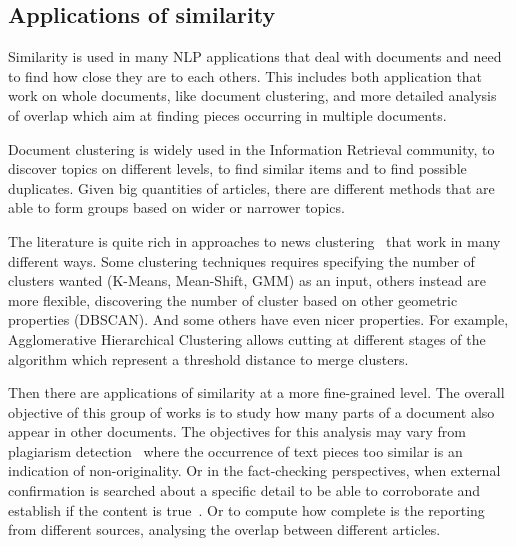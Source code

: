 \subsection{Applications of similarity}

Similarity is used in many NLP applications that deal with documents and need to find how close they are to each others. This includes both application that work on whole documents, like document clustering, and more detailed analysis of overlap which aim at finding pieces occurring in multiple documents.

Document clustering is widely used in the Information Retrieval community, to discover topics on different levels, to find similar items and to find possible duplicates. Given big quantities of articles, there are different methods that are able to form groups based on wider or narrower topics.

The literature is quite rich in approaches to news clustering~\cite{carpineto2009survey,andrews2007recent} %
that work in many different ways.
Some clustering techniques requires specifying the number of clusters wanted (K-Means, Mean-Shift, GMM) as an input, others instead are more flexible, discovering the number of cluster based on other geometric properties (DBSCAN).
And some others have even nicer properties.
For example, Agglomerative Hierarchical Clustering allows cutting at different stages of the algorithm which represent a threshold distance to merge clusters.






Then there are applications of similarity at a more fine-grained level.
The overall objective of this group of works is to study how many parts of a document also appear in other documents.
The objectives for this analysis may vary from plagiarism detection~\cite{potthast2010evaluation} where the occurrence of text pieces too similar is an indication of non-originality.
Or in the fact-checking perspectives, when external confirmation is searched about a specific detail to be able to corroborate and establish if the content is true~\cite{karadzhov2017fully}.
Or to compute how complete is the reporting from different sources, analysing the overlap between different articles.

